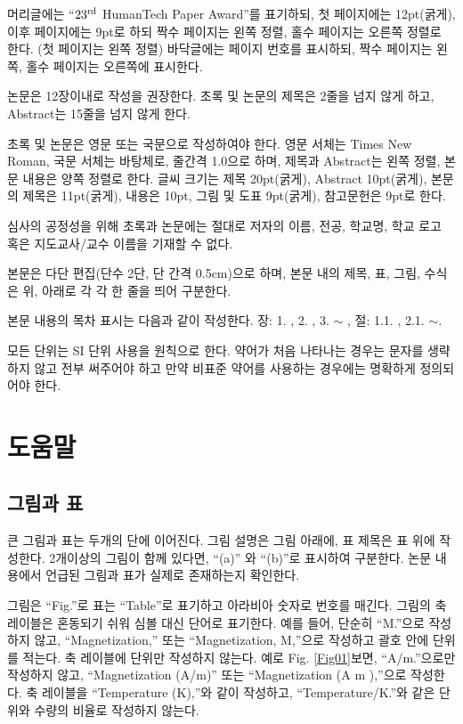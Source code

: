 \documentclass{fullpaper_hutech}
\begin{document}
머리글에는 ``$23^{\rm rd}$ HumanTech Paper Award''를 표기하되, 첫 페이지에는 12pt(굵게), 이후 페이지에는 9pt로 하되 짝수 페이지는 왼쪽 정렬, 홀수 페이지는 오른쪽 정렬로 한다. (첫 페이지는 왼쪽 정렬) 바닥글에는 페이지 번호를 표시하되, 짝수 페이지는 왼쪽, 홀수 페이지는 오른쪽에 표시한다.

논문은 12장이내로 작성을 권장한다. 초록 및 논문의 제목은 2줄을 넘지 않게 하고, Abstract는 15줄을 넘지 않게 한다.

초록 및 논문은 영문 또는 국문으로 작성하여야 한다. 영문 서체는 Times New Roman, 국문 서체는 바탕체로, 줄간격 1.0으로 하며, 제목과 Abstract는 왼쪽 정렬, 본문 내용은 양쪽 정렬로 한다. 글씨 크기는 제목 20pt(굵게), Abstract 10pt(굵게), 본문의 제목은 11pt(굵게), 내용은 10pt, 그림 및 도표 9pt(굵게), 참고문헌은 9pt로 한다. 

심사의 공정성을 위해 초록과 논문에는 절대로 저자의 이름, 전공, 학교명, 학교 로고 혹은 지도교사/교수 이름을 기재할 수 없다.

본문은 다단 편집(단수 2단, 단 간격 0.5cm)으로 하며, 본문 내의 제목, 표, 그림, 수식은 위, 아래로 각 각 한 줄을 띄어 구분한다.

본문 내용의 목차 표시는 다음과 같이 작성한다. 장: 1. , 2. , 3. $ \sim $ , 절: 1.1. , 2.1. $ \sim $.

모든 단위는 SI 단위 사용을 원칙으로 한다. 약어가 처음 나타나는 경우는 문자를 생략하지 않고 전부 써주어야 하고 만약 비표준 약어를 사용하는 경우에는 명확하게 정의되어야 한다.

\section{도움말}

\subsection{그림과 표}

큰 그림과 표는 두개의 단에 이어진다. 그림 설명은 그림 아래에, 표 제목은 표 위에 작성한다. 2개이상의 그림이 함께 있다면, ``(a)'' 와 ``(b)''로 표시하여 구분한다. 논문 내용에서 언급된 그림과 표가 실제로 존재하는지 확인한다. 

그림은 ``Fig.''로 표는 ``Table''로 표기하고 아라비아 숫자로 번호를 매긴다. 
그림의 축 레이블은 혼동되기 쉬워 심볼 대신 단어로 표기한다. 예를 들어, 단순히 ``M.''으로 작성하지 않고, ``Magnetization,'' 또는 ``Magnetization, M,''으로 작성하고 괄호 안에 단위를 적는다. 축 레이블에 단위만 작성하지 않는다. 예로 Fig. \ref{Fig01}\를 보면, ``A/m.''으로만 작성하지 않고, ``Magnetization (A/m)'' 또는 ``Magnetization (A m ),''으로 작성한다. 축 레이블을 ``Temperature (K),''와 같이 작성하고, ``Temperature/K.''와 같은 단위와 수량의 비율로 작성하지 않는다. 
\end{document}
